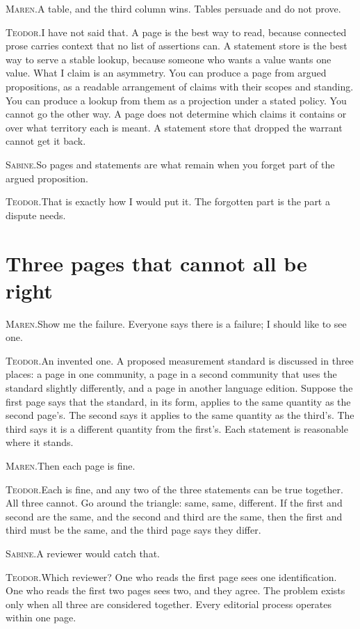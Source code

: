 \documentclass[11pt]{article}
\newcommand{\say}[2]{\par\noindent\textsc{#1.}\enspace #2\par}
\newcommand{\MA}[1]{\say{Maren}{#1}}
\newcommand{\TE}[1]{\say{Teodor}{#1}}
\newcommand{\SA}[1]{\say{Sabine}{#1}}
\begin{document}
\MA{A table, and the third column wins. Tables persuade and do not prove.}

\TE{I have not said that. A page is the best way to read, because connected prose carries context that no list of assertions can. A statement store is the best way to serve a stable lookup, because someone who wants a value wants one value. What I claim is an asymmetry. You can produce a page from argued propositions, as a readable arrangement of claims with their scopes and standing. You can produce a lookup from them as a projection under a stated policy. You cannot go the other way. A page does not determine which claims it contains or over what territory each is meant. A statement store that dropped the warrant cannot get it back.}

\SA{So pages and statements are what remain when you forget part of the argued proposition.}

\TE{That is exactly how I would put it. The forgotten part is the part a dispute needs.}

\section{Three pages that cannot all be right}

\MA{Show me the failure. Everyone says there is a failure; I should like to see one.}

\TE{An invented one. A proposed measurement standard is discussed in three places: a page in one community, a page in a second community that uses the standard slightly differently, and a page in another language edition. Suppose the first page says that the standard, in its form, applies to the same quantity as the second page's. The second says it applies to the same quantity as the third's. The third says it is a different quantity from the first's. Each statement is reasonable where it stands.}

\MA{Then each page is fine.}

\TE{Each is fine, and any two of the three statements can be true together. All three cannot. Go around the triangle: same, same, different. If the first and second are the same, and the second and third are the same, then the first and third must be the same, and the third page says they differ.}

\SA{A reviewer would catch that.}

\TE{Which reviewer? One who reads the first page sees one identification. One who reads the first two pages sees two, and they agree. The problem exists only when all three are considered together. Every editorial process operates within one page.}
\end{document}
